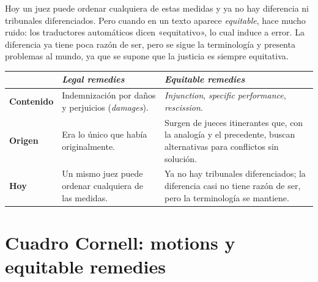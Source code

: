\documentclass[12pt,oneside]{book}
\begin{document}
Hoy un juez puede ordenar cualquiera de estas medidas y ya no hay diferencia ni tribunales diferenciados. Pero cuando en un texto aparece \textit{equitable}, hace mucho ruido: los traductores automáticos dicen «equitativo», lo cual induce a error. La diferencia ya tiene poca razón de ser, pero se sigue la terminología y presenta problemas al mundo, ya que se supone que la justicia es siempre equitativa.

\begin{table}[H]
\centering
\begin{tabularx}{\textwidth}{P{2.4cm}LL}
\toprule
 & \textbf{\textit{Legal remedies}} & \textbf{\textit{Equitable remedies}} \\
\midrule
\textbf{Contenido} & Indemnización por daños y perjuicios (\textit{damages}). & \textit{Injunction}, \textit{specific performance}, \textit{rescission}. \\
\textbf{Origen} & Era lo único que había originalmente. & Surgen de jueces itinerantes que, con la analogía y el precedente, buscan alternativas para conflictos sin solución. \\
\textbf{Hoy} & Un mismo juez puede ordenar cualquiera de las medidas. & Ya no hay tribunales diferenciados; la diferencia casi no tiene razón de ser, pero la terminología se mantiene. \\
\bottomrule
\end{tabularx}
\end{table}

\section{Cuadro Cornell: motions y equitable remedies}
\end{document}
